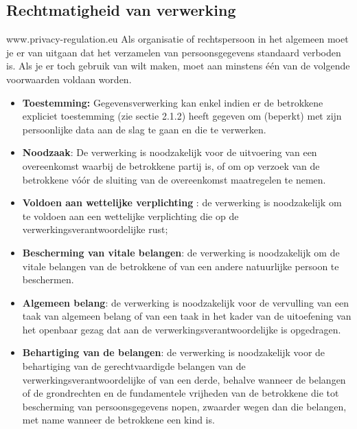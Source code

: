 \subsection{Rechtmatigheid van verwerking} www.privacy-regulation.eu
Als organisatie of rechtspersoon in het algemeen moet je er van uitgaan dat het verzamelen van persoonsgegevens standaard verboden is. Als je er toch gebruik van wilt maken, moet aan minstens één van de volgende voorwaarden voldaan worden. 
\begin{itemize}
    \item \textbf{Toestemming:} Gegevensverwerking kan enkel indien er de betrokkene expliciet toestemming (zie sectie 2.1.2) heeft gegeven om (beperkt) met zijn persoonlijke data aan de slag te gaan en die te verwerken. \\
    
    \item \textbf{Noodzaak}: De verwerking is noodzakelijk voor de uitvoering van een overeenkomst waarbij de betrokkene partij is, of om op verzoek van de betrokkene vóór de sluiting van de overeenkomst maatregelen te nemen. \\
    
    \item \textbf{Voldoen aan wettelijke verplichting }: de verwerking is noodzakelijk om te voldoen aan een wettelijke verplichting die op de verwerkingsverantwoordelijke rust; \\
    
     \item \textbf{Bescherming van vitale belangen}:  de verwerking is noodzakelijk om de vitale belangen van de betrokkene of van een andere natuurlijke persoon te beschermen. \\
    
    \item \textbf{Algemeen belang}: de verwerking is noodzakelijk voor de vervulling van een taak van algemeen belang of van een taak in het kader van de uitoefening van het openbaar gezag dat aan de verwerkingsverantwoordelijke is opgedragen. \\
    
     \item \textbf{Behartiging van de belangen}: de verwerking is noodzakelijk voor de behartiging van de gerechtvaardigde belangen van de verwerkingsverantwoordelijke of van een derde, behalve wanneer de belangen of de grondrechten en de fundamentele vrijheden van de betrokkene die tot bescherming van persoonsgegevens nopen, zwaarder wegen dan die belangen, met name wanneer de betrokkene een kind is. \\
\end{itemize}

